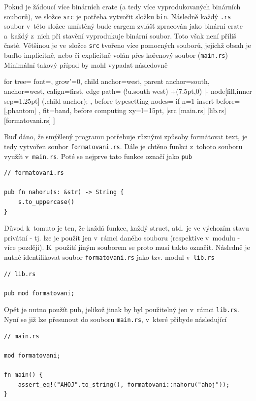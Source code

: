 \documentclass[a4paper, 12pt]{article} %
\newcommand{\rust}[1]{\texttt{#1}}
\begin{document}
		Pokud je žádoucí více binárních crate (a tedy více vyprodukovaných binárních souborů), ve složce \texttt{src} je potřeba vytvořit složku \texttt{bin}. Následně každý \texttt{.rs} soubor v~této složce umístěný bude cargem zvlášť zpracován jako binární crate a~každý z~nich při stavění vyprodukuje binární soubor. Toto však není příliš časté. Většinou je ve~složce \texttt{src} tvořeno více pomocných souborů, jejichž obsah je buďto implicitně, nebo či explicitně volán přes kořenový soubor (\texttt{main.rs}) Minimální takový případ by mohl vypadat následovně

		\begin{center}
			\begin{forest}
				for tree={
				font=\ttfamily,
				grow'=0,
				child anchor=west,
				parent anchor=south,
				anchor=west,
				calign=first,
				edge path={
					\noexpand{}
					(!u.south west) +(7.5pt,0) |- node[fill,inner sep=1.25pt] {} (.child anchor);
				},
				before typesetting nodes={
					if n=1
					{insert before={[,phantom]}}
					{}
				},
				fit=band,
				before computing xy={l=15pt},
				}
			[src
				[main.rs]
				[lib.rs]
				[formatovani.rs]
			]
			\end{forest}
		\end{center}
		
		Buď dáno, že smýšlený programu potřebuje různými způsoby formátovat text, je tedy vytvořen soubor \texttt{formatovani.rs}. Dále je chtěno funkci z~tohoto souboru využít v~\texttt{main.rs}. Poté se nejprve tato funkce označí jako \rust{pub}
		\begin{verbatim}
// formatovani.rs

pub fn nahoru(s: &str) -> String {
	s.to_uppercase()
}
		\end{verbatim}

		Důvod k~tomuto je ten, že každá funkce, každý struct, atd. je ve výchozím stavu privátní - tj. lze je použít jen v~rámci daného souboru (respektive v~modulu - více později). K~použití jiným souborem se proto musí takto označit. Následně je nutné identifikovat soubor \texttt{formatovani.rs} jako tzv. modul v~\texttt{lib.rs}
		\begin{verbatim}
// lib.rs

pub mod formatovani;
		\end{verbatim}
		
		Opět je nutno použít pub, jelikož jinak by byl použitelný jen v~rámci \texttt{lib.rs}. Nyní se již lze přesunout do souboru \texttt{main.rs}, v~které přibyde následující
		\begin{verbatim}
// main.rs

mod formatovani;

fn main() {
	assert_eq!("AHOJ".to_string(), formatovani::nahoru("ahoj"));    
}
		\end{verbatim}
		
\end{document}
